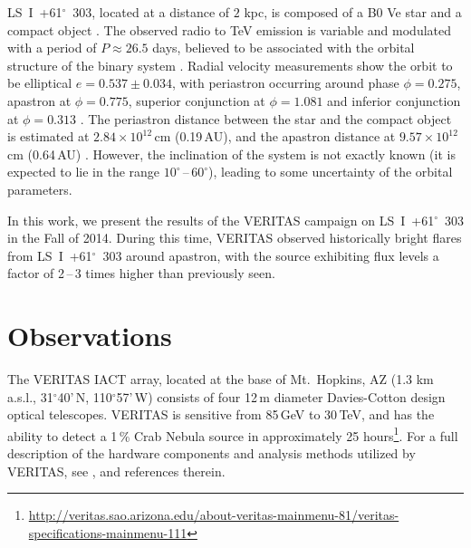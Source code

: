 \documentclass[preprint2]{aastex}
\newcommand{\tapp}{\raisebox{0.5ex}{\texttildelow}}
\newcommand{\lsi}{LS~I~+61$^{\circ}$~303}
\newcommand{\gev}{\,GeV}
\newcommand{\tev}{\,TeV}
\begin{document}
\lsi{}, located at a distance of \tapp{}$2$ kpc, is composed of a B0 Ve star and a compact object \citep{HandC1981, Casares2005}. The observed radio to TeV emission is variable and modulated with a period of $P \approx 26.5$ days, believed to be associated with the orbital structure of the binary system \citep{Albert2006, Esposito2007, VERITASLSIDetection, Abdo2009, LiXray, 2015A&A...575L...9M}. Radial velocity measurements show the orbit to be elliptical $e = 0.537\pm0.034$, with periastron occurring around phase $\phi=0.275$, apastron at $\phi=0.775$, superior conjunction at $\phi=1.081$ and inferior conjunction at $\phi=0.313$ \citep{Aragona2009}. The periastron distance between the star and the compact object is estimated at $2.84 \times 10^{12}$\,cm (0.19\,AU), and the apastron distance at $9.57 \times 10^{12}$\,cm (0.64\,AU) \citep{2013A&ARv..21...64D}. However, the inclination of the system is not exactly known (it is expected to lie in the range $10^\circ$\,--\,$60^\circ$), leading to some uncertainty of the orbital parameters.


In this work, we present the results of the VERITAS campaign on \lsi{} in the Fall of 2014. During this time, VERITAS observed historically bright flares from \lsi{} around apastron, with the source exhibiting flux levels a factor of 2\,--\,3 times higher than previously seen.

\section{Observations}
The VERITAS IACT array, located at the base of Mt.\ Hopkins, AZ (1.3 km a.s.l., 31$^{\circ}$40'\,N, 110$^{\circ}$57'\,W) consists of four 12\,m diameter Davies-Cotton design optical telescopes. VERITAS is sensitive from 85\gev{} to 30\tev{}, and has the ability to detect a 1\,\% Crab Nebula source in approximately 25 hours\footnote{\url{http://veritas.sao.arizona.edu/about-veritas-mainmenu-81/veritas-specifications-mainmenu-111}}. For a full description of the hardware components and analysis methods utilized by VERITAS, see \citet{VERITAS, KiedaVTSUpgrade, VERITASLSIDetection}, and references therein.
\end{document}
